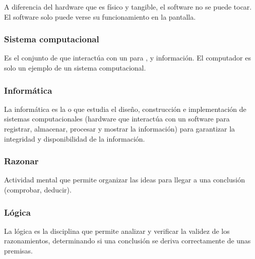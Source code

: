 \documentclass[letterpaper,10pt,spanish]{sphinxmanual}
\begin{document}
\sphinxAtStartPar
A diferencia del hardware que es físico y tangible, el software no se puede tocar. El software solo puede verse su funcionamiento en la pantalla.


\subsubsection{Sistema computacional}
\label{\detokenize{1_guias/8logica/G829:sistema-computacional}}
\sphinxAtStartPar
Es el conjunto de  que interactúa con un  para ,  y  información. El computador es solo un ejemplo de un sistema computacional.


\subsubsection{Informática}
\label{\detokenize{1_guias/8logica/G829:informatica}}
\sphinxAtStartPar
La informática es la  o  que estudia el diseño, construcción e implementación de sistemas computacionales (hardware que interactúa con un software para registrar, almacenar, procesar y mostrar la información) para garantizar la integridad y disponibilidad de la información.


\subsubsection{Razonar}
\label{\detokenize{1_guias/8logica/G829:razonar}}
\sphinxAtStartPar
Actividad mental que permite organizar las ideas para llegar a una conclusión (comprobar, deducir).


\subsubsection{Lógica}
\label{\detokenize{1_guias/8logica/G829:logica}}
\sphinxAtStartPar
La lógica es la disciplina que permite analizar y verificar la validez de los razonamientos, determinando si una conclusión se deriva correctamente de unas premisas.
\end{document}
